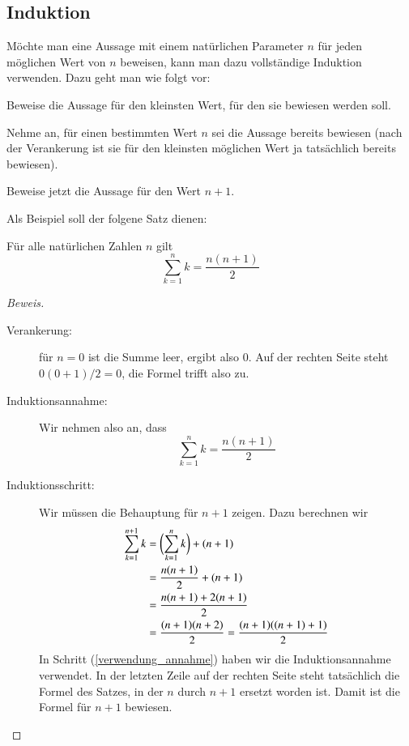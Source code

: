 \subsection{Induktion}
%
%
Möchte man eine Aussage mit einem natürlichen Parameter $n$ für jeden
möglichen Wert von $n$ beweisen, kann man dazu vollständige Induktion
verwenden. Dazu geht man wie folgt vor:
\begin{description}
%
\item[Verankerung:] Beweise die Aussage für den kleinsten Wert,
für den sie bewiesen werden soll.
%
\item[Induktionsannahme:] Nehme an, für einen bestimmten Wert
$n$ sei die Aussage bereits bewiesen (nach der Verankerung ist sie 
für den kleinsten möglichen Wert ja tatsächlich bereits bewiesen).
%
\item[Induktionsschritt:] Beweise jetzt die Aussage für den Wert $n+1$.
\end{description}

Als Beispiel soll der folgene Satz dienen:

\begin{satz} Für alle natürlichen Zahlen $n$ gilt
\[
\sum_{k=1}^nk=\frac{n(n+1)}2
\]
\end{satz}
\begin{proof}[Beweis]
\begin{description}
\item[Verankerung:] für $n=0$ ist die Summe leer, ergibt also $0$.
Auf der rechten Seite steht $0(0+1)/2=0$, die Formel trifft also zu.
\item[Induktionsannahme:]Wir nehmen also an, dass
\[
\sum_{k=1}^nk=\frac{n(n+1)}2
\]
\item[Induktionsschritt:] Wir müssen die Behauptung für $n+1$ zeigen. Dazu
berechnen wir
\begin{align}
\sum_{k=1}^{n+1}k&=\biggl(\sum_{k=1}^nk\biggr) + (n+1)\notag\\
&=\frac{n(n+1)}2+(n+1)\label{verwendung_annahme}\\
&=\frac{n(n+1)+2(n+1)}2\notag\\
&=\frac{(n+1)(n+2)}2=\frac{(n+1)((n+1)+1)}2\notag
\end{align}
In Schritt (\ref{verwendung_annahme}) haben wir die Induktionsannahme
verwendet. In der letzten Zeile auf der rechten Seite steht tatsächlich
die Formel des Satzes, in der $n$ durch $n+1$ ersetzt worden ist.
Damit ist die Formel für $n+1$ bewiesen.
\end{description}
\end{proof}
